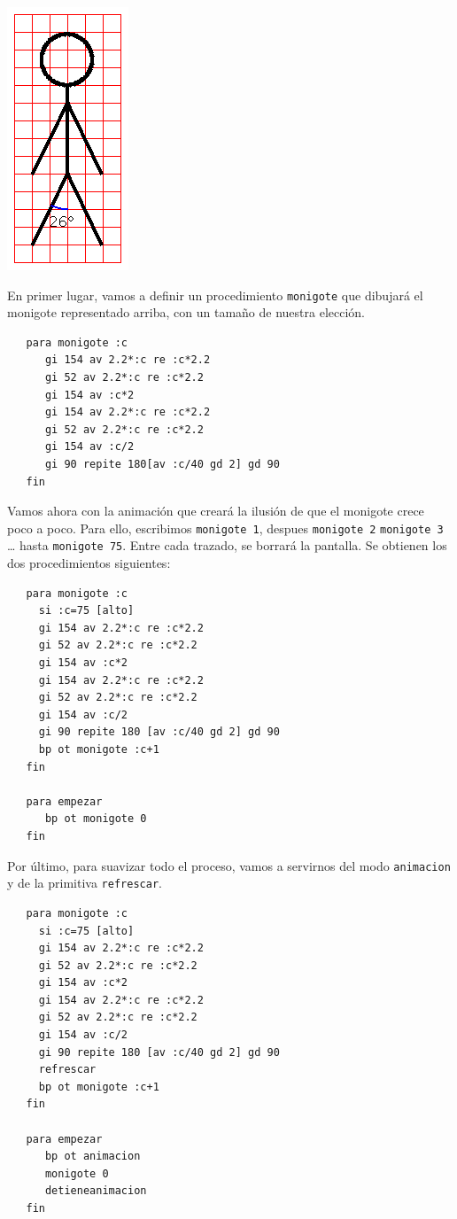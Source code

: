 \documentclass[12pt,twoside,spanish,a4paper]{report}
\begin{document}
% 
\noindent \begin{center}
   \includegraphics[scale=0.75]{Imagenes_Tutorial/14_Monigote.png}
\end{center}
En primer lugar, vamos a definir un procedimiento \texttt{monigote} que dibujar\'a
el monigote representado arriba, con un tama\~no de nuestra elecci\'on.
\begin{verbatim}
   para monigote :c
      gi 154 av 2.2*:c re :c*2.2
      gi 52 av 2.2*:c re :c*2.2
      gi 154 av :c*2
      gi 154 av 2.2*:c re :c*2.2
      gi 52 av 2.2*:c re :c*2.2
      gi 154 av :c/2
      gi 90 repite 180[av :c/40 gd 2] gd 90
   fin  \end{verbatim}

Vamos ahora con la animaci\'on que crear\'a la ilusi\'on de que el monigote
crece poco a poco. Para ello, escribimos \texttt{monigote 1}, despues
\texttt{monigote 2} \texttt{monigote 3} \ldots{} hasta \texttt{monigote
75}. Entre cada trazado, se borrar\'a la pantalla. Se obtienen los dos
procedimientos siguientes:
\begin{verbatim}
   para monigote :c
     si :c=75 [alto]
     gi 154 av 2.2*:c re :c*2.2
     gi 52 av 2.2*:c re :c*2.2
     gi 154 av :c*2
     gi 154 av 2.2*:c re :c*2.2
     gi 52 av 2.2*:c re :c*2.2
     gi 154 av :c/2
     gi 90 repite 180 [av :c/40 gd 2] gd 90
     bp ot monigote :c+1
   fin

   para empezar
      bp ot monigote 0
   fin \end{verbatim}

Por \'ultimo, para suavizar todo el proceso, vamos a servirnos del modo
\texttt{animacion} y de la primitiva \texttt{refrescar}.
\begin{verbatim}
   para monigote :c
     si :c=75 [alto]
     gi 154 av 2.2*:c re :c*2.2
     gi 52 av 2.2*:c re :c*2.2
     gi 154 av :c*2
     gi 154 av 2.2*:c re :c*2.2
     gi 52 av 2.2*:c re :c*2.2
     gi 154 av :c/2
     gi 90 repite 180 [av :c/40 gd 2] gd 90
     refrescar
     bp ot monigote :c+1
   fin

   para empezar
      bp ot animacion
      monigote 0
      detieneanimacion
   fin \end{verbatim}
\end{document}
